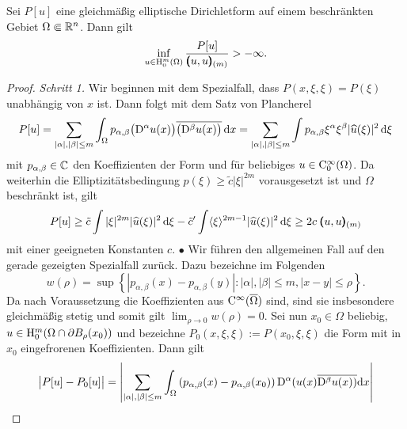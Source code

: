 \begin{thm}
Sei $P[u]$ eine gleichmäßig elliptische Dirichletform auf einem beschränkten Gebiet $\Omega\Subset\mathbb R^n$. Dann gilt
\begin{equation}
  \inf_{u\in\mathrm H_0^m(\Omega)} \frac{P[u]}{\pmb(u,u\pmb)_{(m)}} > -\infty.
\end{equation}
\end{thm}
\begin{proof}
{\sl Schritt 1.} Wir beginnen mit dem Spezialfall, dass $P(x,\xi,\xi) = P(\xi)$ unabhängig von $x$ ist. Dann folgt mit dem Satz von Plancherel
\begin{equation}
 P[u] =  \sum_{|\alpha|,|\beta|\le m} \int_\Omega  p_{\alpha,\beta} \big(\mathrm D^\alpha u(x)\big)\overline{\big(\mathrm D^\beta u(x)\big)} \,\mathrm d x
 =   \sum_{|\alpha|,|\beta|\le m} \int  p_{\alpha,\beta} \xi^\alpha \xi^\beta  |\widehat u(\xi)|^2 \,\mathrm d\xi 
\end{equation}
mit $p_{\alpha,\beta}\in\mathbb C$ den Koeffizienten der Form und für beliebiges $u\in\mathrm C_0^\infty(\Omega)$. Da weiterhin die Elliptizitätsbedingung $p(\xi)\ge \tilde c |\xi|^{2m}$ 
vorausgesetzt ist und $\Omega$ beschränkt ist, gilt
\begin{equation}
  P[u] \ge \tilde c \int |\xi|^{2m} |\widehat u(\xi)|^2 \,\mathrm d\xi  -  \tilde c' \int \langle \xi\rangle^{2m-1} |\widehat u(\xi)|^2 \,\mathrm d\xi  \ge  2c\; \pmb(u,u\pmb)_{(m)}
\end{equation}
mit einer geeigneten Konstanten $c$. $\bullet$  Wir führen den allgemeinen Fall auf den gerade gezeigten Spezialfall zurück. Dazu bezeichne im Folgenden
\begin{equation}
	w(\rho) = \sup\left\{| p_{\alpha,\beta}(x)-p_{\alpha,\beta}(y)| : |\alpha|, |\beta| \le m, | x-y| \le \rho\right\}.
\end{equation} 
Da nach Voraussetzung die Koeffizienten aus $\mathrm C^\infty(\overline\Omega)$ sind, sind sie insbesondere gleichmäßig stetig und somit gilt
$\lim_{\rho\to0} w(\rho)=0$.  Sei nun $x_0\in \Omega$ beliebig, $u\in \mathrm H_0^m(\Omega\cap \partial B_\rho(x_0))$ und bezeichne $P_0(x,\xi, \xi):=P(x_0,\xi,\xi)$ die Form mit in $x_0$ eingefrorenen Koeffizienten. Dann gilt
\begin{equation}
\begin{split}
\big| P[u]-P_0[u] \big| &=\left| \sum\limits_{|\alpha|, |\beta| \le m} \int_\Omega \left(p_{\alpha,\beta}(x)-p_{\alpha,\beta}(x_0)\right){\D^\alpha(u(x)}\overline{\D^\beta u(x))}\mathrm{d}x\right|\\

\end{split}
\end{equation}
\end{proof}
